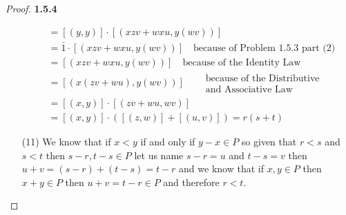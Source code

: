 \documentclass[11pt]{article}
\theoremstyle{definition}
\begin{document}
\begin{proof}{\textbf{1.5.4}}
\begin{itemize}
\begin{align*}
                &= [(y,y)]\cdot[(xzv + wxu, y(wv))]\\
                &= \bar{1} \cdot[(xzv + wxu, y(wv))] \quad \text{because of Problem 1.5.3 part (2)}\\
                &= [(xzv + wxu, y(wv))] \quad \text{because of the Identity Law}\\
                &= [(x(zv+wu),y(wv))] \quad \begin{aligned} &\text{because of the Distributive}\\
                                                            &\text{and Associative Law}\end{aligned}\\
                &= [(x,y)]\cdot[(zv+wu,wv)]\\
                &= [(x,y)]\cdot([(z,w)]+[(u,v)]) = r(s+t)
        \end{align*}
        \item [(11)]
        We know that if $x<y$ if and only if $y-x \in P$ so given that $r<s$ and $s<t$
        then $s-r, t-s \in P$ let us name $s-r = u$ and $t-s = v$ then
        $u+v = (s-r) + (t-s) = t-r$ and we know that if $x,y \in P$ then $x+y \in P$
        then $u+v = t-r \in P$ and therefore $r<t$.  
        \end{itemize}
    \end{proof}
\end{document}
